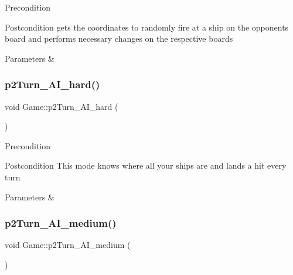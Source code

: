 \begin{DoxyPrecond}{Precondition}

\end{DoxyPrecond}
\begin{DoxyPostcond}{Postcondition}
gets the coordinates to randomly fire at a ship on the opponents board and performs necessary changes on the respective boards 
\end{DoxyPostcond}

\begin{DoxyParams}{Parameters}
{\em } & \\
\hline
\end{DoxyParams}
\mbox{\label{classGame_a7649f2a88556628a0ff66eaf022be907}} 
\subsubsection{\texorpdfstring{p2\+Turn\+\_\+\+A\+I\+\_\+hard()}{p2Turn\_AI\_hard()}}
{\footnotesize\ttfamily void Game\+::p2\+Turn\+\_\+\+A\+I\+\_\+hard (\begin{DoxyParamCaption}{ }\end{DoxyParamCaption})}

\begin{DoxyPrecond}{Precondition}

\end{DoxyPrecond}
\begin{DoxyPostcond}{Postcondition}
This mode knows where all your ships are and lands a hit every turn 
\end{DoxyPostcond}

\begin{DoxyParams}{Parameters}
{\em } & \\
\hline
\end{DoxyParams}
\mbox{\label{classGame_af23dd6df0f894642f5b085fbf04615c2}} 
\subsubsection{\texorpdfstring{p2\+Turn\+\_\+\+A\+I\+\_\+medium()}{p2Turn\_AI\_medium()}}
{\footnotesize\ttfamily void Game\+::p2\+Turn\+\_\+\+A\+I\+\_\+medium (\begin{DoxyParamCaption}{ }\end{DoxyParamCaption})}


